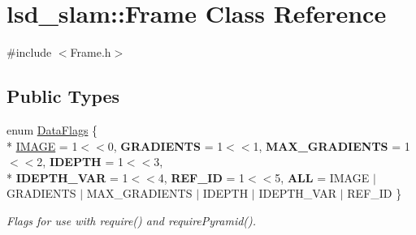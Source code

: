 \hypertarget{classlsd__slam_1_1_frame}{\section{lsd\-\_\-slam\-:\-:Frame Class Reference}
\label{classlsd__slam_1_1_frame}
}


{\ttfamily \#include $<$Frame.\-h$>$}

\subsection*{Public Types}
\begin{DoxyCompactItemize}
\item 
enum \hyperlink{classlsd__slam_1_1_frame_a91c2bcdbabb5db67344b5379588e6990}{Data\-Flags} \{ \\*
\hyperlink{classlsd__slam_1_1_frame_a91c2bcdbabb5db67344b5379588e6990a69a787772398fe81ca7a7bbe5e43d05a}{I\-M\-A\-G\-E} = 1$<$$<$0, 
{\bfseries G\-R\-A\-D\-I\-E\-N\-T\-S} = 1$<$$<$1, 
{\bfseries M\-A\-X\-\_\-\-G\-R\-A\-D\-I\-E\-N\-T\-S} = 1$<$$<$2, 
{\bfseries I\-D\-E\-P\-T\-H} = 1$<$$<$3, 
\\*
{\bfseries I\-D\-E\-P\-T\-H\-\_\-\-V\-A\-R} = 1$<$$<$4, 
{\bfseries R\-E\-F\-\_\-\-I\-D} = 1$<$$<$5, 
{\bfseries A\-L\-L} = I\-M\-A\-G\-E $\vert$ G\-R\-A\-D\-I\-E\-N\-T\-S $\vert$ M\-A\-X\-\_\-\-G\-R\-A\-D\-I\-E\-N\-T\-S $\vert$ I\-D\-E\-P\-T\-H $\vert$ I\-D\-E\-P\-T\-H\-\_\-\-V\-A\-R $\vert$ R\-E\-F\-\_\-\-I\-D
 \}
\begin{DoxyCompactList}\small\item\em Flags for use with require() and require\-Pyramid(). \end{DoxyCompactList}\end{DoxyCompactItemize}
